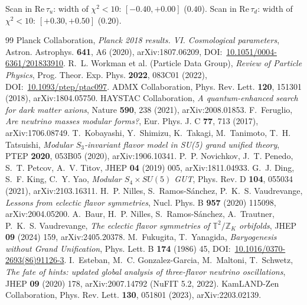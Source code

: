 \documentclass[12pt,a4paper]{article}
\numberwithin{equation}{section}
\begin{document}
Scan in \(\mathrm{Re}\,\tau_u\): width of \(\chi^2<10\): \([-0.40, +0.00]\) (\(0.40\)).
Scan in \(\mathrm{Re}\,\tau_d\): width of \(\chi^2<10\): \([+0.30, +0.50]\) (\(0.20\)).

\begin{thebibliography}{99}
 Planck Collaboration, \emph{Planck 2018 results. VI. Cosmological parameters}, Astron. Astrophys. \textbf{641}, A6 (2020), arXiv:1807.06209, DOI:~\href{https://doi.org/10.1051/0004-6361/201833910}{10.1051/0004-6361/201833910}.
 R.~L. Workman et al. (Particle Data Group), \emph{Review of Particle Physics}, Prog. Theor. Exp. Phys. \textbf{2022}, 083C01 (2022), DOI:~\href{https://doi.org/10.1093/ptep/ptac097}{10.1093/ptep/ptac097}.
 ADMX Collaboration, Phys. Rev. Lett. \textbf{120}, 151301 (2018), arXiv:1804.05750.
 HAYSTAC Collaboration, \emph{A quantum-enhanced search for dark matter axions}, Nature \textbf{590}, 238 (2021), arXiv:2008.01853.
 F.~Feruglio, \emph{Are neutrino masses modular forms?}, Eur. Phys. J. C \textbf{77}, 713 (2017), arXiv:1706.08749.
 T.~Kobayashi, Y.~Shimizu, K.~Takagi, M.~Tanimoto, T.~H. Tatsuishi, \emph{Modular \(S_3\)-invariant flavor model in SU(5) grand unified theory}, PTEP \textbf{2020}, 053B05 (2020), arXiv:1906.10341.
 P.~P. Novichkov, J.~T. Penedo, S.~T. Petcov, A.~V. Titov, JHEP \textbf{04} (2019) 005, arXiv:1811.04933.
 G.~J. Ding, S.~F. King, C.~Y. Yao, \emph{Modular \(S_4 \times SU(5)\) GUT}, Phys. Rev. D \textbf{104}, 055034 (2021), arXiv:2103.16311.
 H.~P. Nilles, S.~Ramos-Sánchez, P.~K.~S. Vaudrevange, \emph{Lessons from eclectic flavor symmetries}, Nucl. Phys. B \textbf{957} (2020) 115098, arXiv:2004.05200.
 A.~Baur, H.~P. Nilles, S.~Ramos-Sánchez, A.~Trautner, P.~K.~S. Vaudrevange, \emph{The eclectic flavor symmetries of \(\mathbb{T}^2/\mathbb{Z}_K\) orbifolds}, JHEP \textbf{09} (2024) 159, arXiv:2405.20378.
 M.~Fukugita, T.~Yanagida, \emph{Baryogenesis without Grand Unification}, Phys. Lett. B \textbf{174} (1986) 45, DOI:~\href{https://doi.org/10.1016/0370-2693(86)91126-3}{10.1016/0370-2693(86)91126-3}.
 I.~Esteban, M.~C. Gonzalez-Garcia, M.~Maltoni, T.~Schwetz, \emph{The fate of hints: updated global analysis of three-flavor neutrino oscillations}, JHEP \textbf{09} (2020) 178, arXiv:2007.14792 (NuFIT 5.2, 2022).
 KamLAND-Zen Collaboration, Phys. Rev. Lett. \textbf{130}, 051801 (2023), arXiv:2203.02139.

\end{thebibliography}
\end{document}
